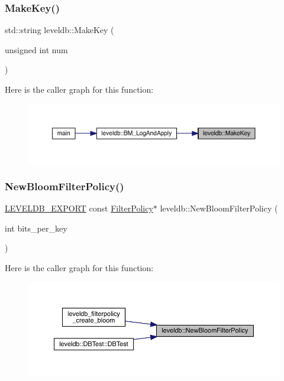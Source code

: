\subsubsection{\texorpdfstring{MakeKey()}{MakeKey()}}
{\footnotesize\ttfamily std\+::string leveldb\+::\+Make\+Key (\begin{DoxyParamCaption}\item[{unsigned int}]{num }\end{DoxyParamCaption})}

Here is the caller graph for this function\+:
\nopagebreak
\begin{figure}[H]
\begin{center}
\leavevmode
\includegraphics[width=350pt]{namespaceleveldb_a706c78e756ff2dcd2185cdf2265c0b8a_icgraph}
\end{center}
\end{figure}
\mbox{\label{namespaceleveldb_a5d57a5a062beeef209ee7c7113de8cce}} 
\subsubsection{\texorpdfstring{NewBloomFilterPolicy()}{NewBloomFilterPolicy()}}
{\footnotesize\ttfamily \mbox{\hyperlink{export_8h_a658cd25b9dd114d894ae8ce9dddb7d3a}{L\+E\+V\+E\+L\+D\+B\+\_\+\+E\+X\+P\+O\+RT}} const \mbox{\hyperlink{classleveldb_1_1_filter_policy}{Filter\+Policy}}$\ast$ leveldb\+::\+New\+Bloom\+Filter\+Policy (\begin{DoxyParamCaption}\item[{int}]{bits\+\_\+per\+\_\+key }\end{DoxyParamCaption})}

Here is the caller graph for this function\+:
\nopagebreak
\begin{figure}[H]
\begin{center}
\leavevmode
\includegraphics[width=350pt]{namespaceleveldb_a5d57a5a062beeef209ee7c7113de8cce_icgraph}
\end{center}
\end{figure}
\mbox{\label{namespaceleveldb_a0d4b256207f27afbf4ad03976fe0fae8}} 
